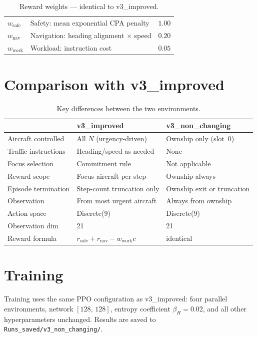 \documentclass[11pt, a4paper]{article}
\begin{document}
\begin{table}[h]
\centering
\caption{Reward weights — identical to v3\_improved.}
\smallskip
\begin{tabular}{llr}
\toprule
$w_\text{safe}$  & Safety: mean exponential CPA penalty       & $1.00$ \\
$w_\text{nav}$   & Navigation: heading alignment $\times$ speed & $0.20$ \\
$w_\text{work}$  & Workload: instruction cost                 & $0.05$ \\
\bottomrule
\end{tabular}
\end{table}

\section{Comparison with v3\_improved}

\begin{table}[h]
\centering
\caption{Key differences between the two environments.}
\smallskip
\begin{tabular}{lll}
\toprule
& \textbf{v3\_improved} & \textbf{v3\_non\_changing} \\
\midrule
Aircraft controlled  & All $N$ (urgency-driven)       & Ownship only (slot~0) \\
Traffic instructions & Heading/speed as needed        & None \\
Focus selection      & Commitment rule                & Not applicable \\
Reward scope         & Focus aircraft per step        & Ownship always \\
Episode termination  & Step-count truncation only     & Ownship exit or truncation \\
Observation          & From most urgent aircraft      & Always from ownship \\
Action space         & Discrete(9)                    & Discrete(9) \\
Observation dim      & 21                             & 21 \\
Reward formula       & $r_\text{safe}+r_\text{nav}-w_\text{work}c$ & identical \\
\bottomrule
\end{tabular}
\end{table}

\section{Training}

Training uses the same PPO configuration as v3\_improved: four parallel
environments, network $[128,\,128]$, entropy coefficient $\beta_H = 0.02$,
and all other hyperparameters unchanged.
Results are saved to \texttt{Runs\_saved/v3\_non\_changing/}.
\end{document}
